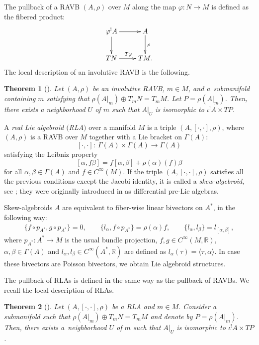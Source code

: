 \documentclass[11pt]{article}
\numberwithin{equation}{section}
\numberwithin{equation}{section}
\newtheorem{Theorem}{Theorem}[section]
\newcommand{\R}{{\mathbb{R}}}
\newcommand{\ra}{\rangle}
\begin{document}
The pullback of a RAVB $(A, \rho) $ over $M$ along the map $\varphi\colon N\to M$ is defined as the fibered product:
\[
\xymatrix{\varphi^! A\ar[d]\ar[r] & A \ar[d]^{\rho}\\
TN\ar[r]^{T\varphi} & TM.}
\]
The local description of an involutive RAVB is the following.
\begin{Theorem}[{\cite[Corollary 3.14]{bursztyn2019splitting}}]\label{splitting_ravb}
Let $(A,\rho)$ be an involutive RAVB, $m\in M$, and  a~submanifold containing $m$ satisfying that $\rho(A|_m)\oplus T_m N=T_m M$. Let $P=\rho(A|_m)$. Then, there exists a neighborhood $U$ of $m$ such that $A|_{U}$ is isomorphic to $\iota^! A\times TP$.
\end{Theorem}
\begin{Definition}A {\em real Lie algebroid $($RLA$)$} over a manifold $M$ is a triple $(A, [\cdot, \cdot], \rho)$, where $(A,\rho)$ is a RAVB over $M$ together with a Lie bracket on $\Gamma(A)$:
\[[\cdot,\cdot]\colon\ \Gamma(A)\times \Gamma(A)\to\Gamma(A)\]
satisfying the Leibniz property
\[[\alpha,f\beta]=f[\alpha,\beta]+\rho(\alpha)(f)\beta\]
 for all $\alpha,\beta\in \Gamma(A)$ and $f\in C^{\infty}(M)$. If the triple $(A,[\cdot,\cdot],\rho)$ satisfies all the previous conditions except the Jacobi identity, it is called a {\em skew-algebroid}, see \cite[Definition 4.1]{grabowski2022nonassociative}; they were originally introduced in \cite{kosmann1990poisson} as differential pre-Lie algebras.
\end{Definition}

Skew-algebroids $A$ are equivalent to fiber-wise linear bivectors on $A^*$, in the following way:
\begin{align*}
\{f\circ p_{A^*},g\circ p_{A^*}\}=0,\qquad
\{l_{\alpha}, f\circ p_{A^*}\}=\rho(\alpha)f,\qquad
\{l_{\alpha},l_{\beta}\}=l_{[\alpha,\beta]},
\end{align*}
where $p_{A^*}\colon A^* \to M$ is the usual bundle projection, $f, g\in C^{\infty}(M,\R)$, $\alpha,\beta\in \Gamma(A)$ and ${l_{\alpha}, l_{\beta}\in C^{\infty}(A^*,\R)}$ are defined as $l_{\alpha}(\tau)=\langle\tau,\alpha\ra$. In case these bivectors are Poisson bivectors, we obtain Lie algebroid structures.

The pullback of RLAs is defined in the same way as the pullback of RAVBs. We recall the local description of RLAs.

\begin{Theorem}[{\cite{bursztyn2019splitting, fernandes2002lie, Dufour2001NormalFF}}]
 Let $(A,[\cdot,\cdot],\rho)$ be a RLA and $m\in M$. Consider a submanifold  such that $\rho(A|_{m})\oplus T_m N=T_m M$ and denote by $P=\rho(A|_{m})$. Then, there exists a~neighborhood $U$ of $m$ such that $A|_{U}$ is isomorphic to $\iota^! A\times TP$.
\end{Theorem}
\end{document}
